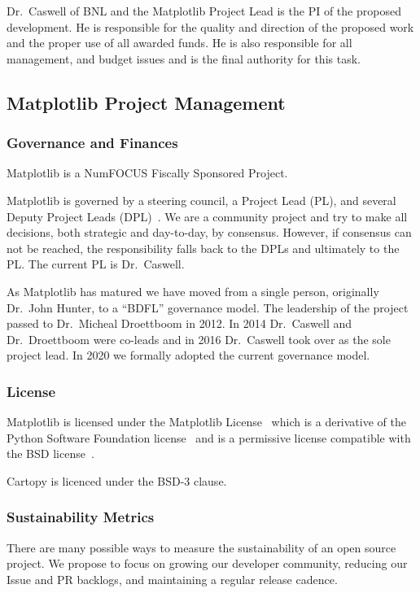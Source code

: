 \documentclass[12pt]{article}
\numberwithin{page}{section}
\begin{document}
Dr.\ Caswell of BNL and the Matplotlib Project Lead is the PI of the proposed
development.  He is responsible for the quality and direction of the proposed
work and the proper use of all awarded funds.  He is also responsible for all
management, and budget issues and is the final authority for this task.


\subsection{Matplotlib Project Management}
\subsubsection{Governance and Finances}

Matplotlib is a NumFOCUS Fiscally Sponsored Project.

Matplotlib is governed by a steering council, a Project Lead (PL), and
several Deputy Project Leads (DPL)~\cite{gov}.  We are a community
project and try to make all decisions, both strategic and day-to-day,
by consensus.  However, if consensus can not be reached, the
responsibility falls back to the DPLs and ultimately to the PL.  The
current PL is Dr.\ Caswell.

As Matplotlib has matured we have moved from a single person,
originally Dr.\ John Hunter, to a ``BDFL'' governance model.  The
leadership of the project passed to Dr.\ Micheal Droettboom in 2012.
In 2014 Dr.\ Caswell and Dr.\ Droettboom were co-leads and in 2016
Dr.\ Caswell took over as the sole project lead.  In 2020 we formally
adopted the current governance model.

\subsubsection{License}

Matplotlib is licensed under the Matplotlib License~\cite{mpl_lic}
which is a derivative of the Python Software Foundation
license~\cite{psf_lic} and is a permissive license compatible with the
BSD license~\cite{jdh_bsd_opinions}.

Cartopy is licenced under the BSD-3 clause.


\subsubsection{Sustainability Metrics}

There are many possible ways to measure the sustainability of an
open source project.  We propose to focus on growing our developer
community, reducing our Issue and PR backlogs, and maintaining a
regular release cadence.
\end{document}
